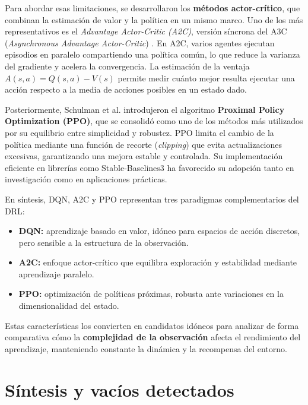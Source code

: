 Para abordar esas limitaciones, se desarrollaron los \textbf{métodos actor-crítico}, que combinan la estimación de valor y la política en un mismo marco.  
Uno de los más representativos es el \textit{Advantage Actor-Critic (A2C)}, versión síncrona del A3C (\textit{Asynchronous Advantage Actor-Critic}) \citep{Mnih2016}.  
En A2C, varios agentes ejecutan episodios en paralelo compartiendo una política común, lo que reduce la varianza del gradiente y acelera la convergencia.  
La estimación de la ventaja $A(s,a) = Q(s,a) - V(s)$ permite medir cuánto mejor resulta ejecutar una acción respecto a la media de acciones posibles en un estado dado.

Posteriormente, Schulman et al. \citeyearpar{Schulman2017} introdujeron el algoritmo \textbf{Proximal Policy Optimization (PPO)}, que se consolidó como uno de los métodos más utilizados por su equilibrio entre simplicidad y robustez.  
PPO limita el cambio de la política mediante una función de recorte (\textit{clipping}) que evita actualizaciones excesivas, garantizando una mejora estable y controlada.  
Su implementación eficiente en librerías como Stable-Baselines3 \citep{Raffin2021} ha favorecido su adopción tanto en investigación como en aplicaciones prácticas.

En síntesis, DQN, A2C y PPO representan tres paradigmas complementarios del DRL:  
\begin{itemize}
    \item \textbf{DQN:} aprendizaje basado en valor, idóneo para espacios de acción discretos, pero sensible a la estructura de la observación.  
    \item \textbf{A2C:} enfoque actor-crítico que equilibra exploración y estabilidad mediante aprendizaje paralelo.  
    \item \textbf{PPO:} optimización de políticas próximas, robusta ante variaciones en la dimensionalidad del estado.  
\end{itemize}

Estas características los convierten en candidatos idóneos para analizar de forma comparativa cómo la \textbf{complejidad de la observación} afecta el rendimiento del aprendizaje, manteniendo constante la dinámica y la recompensa del entorno.  

\vspace{0.5em}

\section{Síntesis y vacíos detectados}


